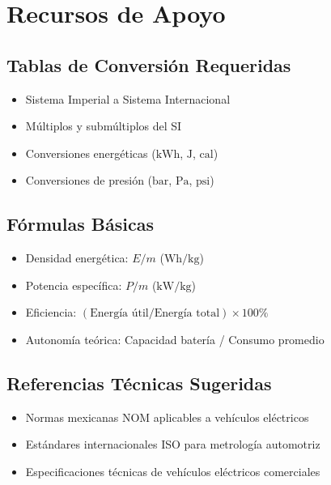 \documentclass{article}
\begin{document}
\section*{Recursos de Apoyo}

\subsection*{Tablas de Conversión Requeridas}
\begin{itemize}
    \item Sistema Imperial a Sistema Internacional
    \item Múltiplos y submúltiplos del SI
    \item Conversiones energéticas ($\text{kWh}$, $\text{J}$, $\text{cal}$)
    \item Conversiones de presión ($\text{bar}$, $\text{Pa}$, $\text{psi}$)
\end{itemize}

\subsection*{Fórmulas Básicas}
\begin{itemize}
    \item Densidad energética: $E/m$ ($\text{Wh/kg}$)
    \item Potencia específica: $P/m$ ($\text{kW/kg}$)
    \item Eficiencia: $(\text{Energía útil} / \text{Energía total}) \times 100\%$
    \item Autonomía teórica: Capacidad batería / Consumo promedio
\end{itemize}

\subsection*{Referencias Técnicas Sugeridas}
\begin{itemize}
    \item Normas mexicanas NOM aplicables a vehículos eléctricos
    \item Estándares internacionales ISO para metrología automotriz
    \item Especificaciones técnicas de vehículos eléctricos comerciales
\end{itemize}
\end{document}
